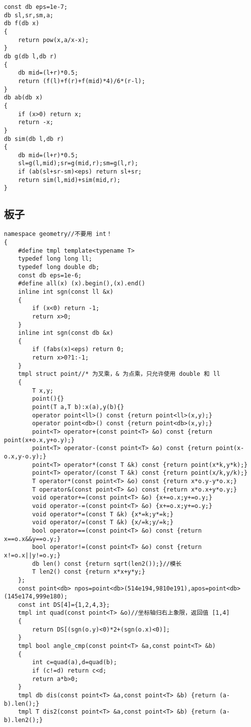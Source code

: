 \documentclass{ctexart}
\begin{document}
\begin{lstlisting}
const db eps=1e-7;
db sl,sr,sm,a;
db f(db x)
{
	return pow(x,a/x-x);
}
db g(db l,db r)
{
	db mid=(l+r)*0.5;
	return (f(l)+f(r)+f(mid)*4)/6*(r-l);
}
db ab(db x)
{
	if (x>0) return x;
	return -x;
}
db sim(db l,db r)
{
	db mid=(l+r)*0.5;
	sl=g(l,mid);sr=g(mid,r);sm=g(l,r);
	if (ab(sl+sr-sm)<eps) return sl+sr;
	return sim(l,mid)+sim(mid,r);
}
\end{lstlisting}

\subsection{板子}

\begin{lstlisting}
namespace geometry//不要用 int！
{
	#define tmpl template<typename T>
	typedef long long ll;
	typedef long double db;
	const db eps=1e-6;
	#define all(x) (x).begin(),(x).end()
	inline int sgn(const ll &x)
	{
		if (x<0) return -1;
		return x>0;
	}
	inline int sgn(const db &x)
	{
		if (fabs(x)<eps) return 0;
		return x>0?1:-1;
	}
	tmpl struct point//* 为叉乘，& 为点乘，只允许使用 double 和 ll
	{
		T x,y;
		point(){}
		point(T a,T b):x(a),y(b){}
		operator point<ll>() const {return point<ll>(x,y);}
		operator point<db>() const {return point<db>(x,y);}
		point<T> operator+(const point<T> &o) const {return point(x+o.x,y+o.y);}
		point<T> operator-(const point<T> &o) const {return point(x-o.x,y-o.y);}
		point<T> operator*(const T &k) const {return point(x*k,y*k);}
		point<T> operator/(const T &k) const {return point(x/k,y/k);}
		T operator*(const point<T> &o) const {return x*o.y-y*o.x;}
		T operator&(const point<T> &o) const {return x*o.x+y*o.y;}
		void operator+=(const point<T> &o) {x+=o.x;y+=o.y;}
		void operator-=(const point<T> &o) {x+=o.x;y+=o.y;}
		void operator*=(const T &k) {x*=k;y*=k;}
		void operator/=(const T &k) {x/=k;y/=k;}
		bool operator==(const point<T> &o) const {return x==o.x&&y==o.y;}
		bool operator!=(const point<T> &o) const {return x!=o.x||y!=o.y;}
		db len() const {return sqrt(len2());}//模长
		T len2() const {return x*x+y*y;}
	};
	const point<db> npos=point<db>(514e194,9810e191),apos=point<db>(145e174,999e180);
	const int DS[4]={1,2,4,3};
	tmpl int quad(const point<T> &o)//坐标轴归右上象限，返回值 [1,4]
	{
		return DS[(sgn(o.y)<0)*2+(sgn(o.x)<0)];
	}
	tmpl bool angle_cmp(const point<T> &a,const point<T> &b)
	{
		int c=quad(a),d=quad(b);
		if (c!=d) return c<d;
		return a*b>0;
	}
	tmpl db dis(const point<T> &a,const point<T> &b) {return (a-b).len();}
	tmpl T dis2(const point<T> &a,const point<T> &b) {return (a-b).len2();}

\end{lstlisting}
\end{document}
